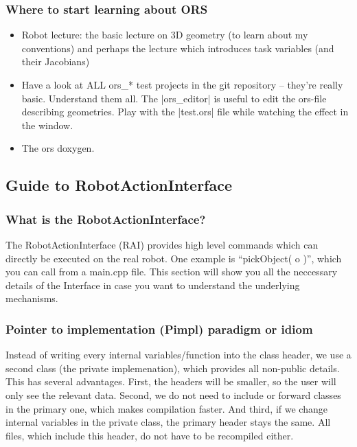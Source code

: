 \subsubsection{Where to start learning about ORS}

\begin{itemize}
\item Robot lecture: the basic lecture on 3D geometry (to learn about my
conventions) and perhaps the lecture which introduces task variables
(and their Jacobians)

\item Have a look at ALL ors\_* test projects in the git repository --
they're really basic. Understand them all. The |ors\_editor| is useful to
edit the ors-file describing geometries. Play with the |test.ors| file
while watching the effect in the window.

\item The ors doxygen.
\end{itemize}



\subsection{Guide to RobotActionInterface}
\subsubsection{What is the RobotActionInterface?}
The RobotActionInterface (RAI) provides high level commands which can directly
be executed on the real robot. One example is ``pickObject( o )'', which you can
call from a main.cpp file. This section will show you all the neccessary details
of the Interface in case you want to understand the underlying mechanisms.
\subsubsection{Pointer to implementation (Pimpl) paradigm or idiom}
Instead of writing every internal variables/function into the class
header, we use a second class (the private implemenation), which provides
all non-public details. This has several advantages. First, the
headers will be smaller, so the user will only see the relevant data. Second, we do
not need to include or forward classes in the primary one, which makes
compilation faster. And third, if we change internal variables in the private
class, the primary header stays the same. All files, which include this header,
do not have to be recompiled either. 

